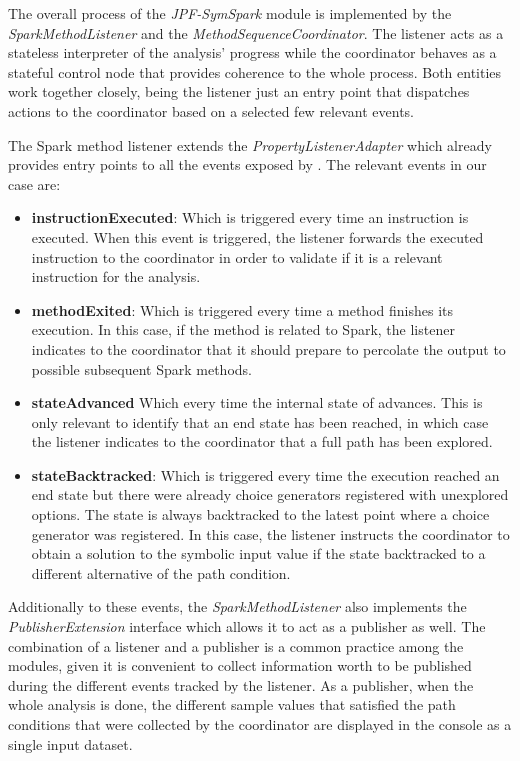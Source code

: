 
The overall process of the \textit{JPF-SymSpark} module is implemented by the \textit{SparkMethodListener} and the \textit{MethodSequenceCoordinator}. The listener acts as a stateless interpreter of the analysis' progress while the coordinator behaves as a stateful control node that provides coherence to the whole process. Both entities work together closely, being the listener just an entry point that dispatches actions to the coordinator based on a selected few relevant events.


The Spark method listener extends the \textit{PropertyListenerAdapter} which already provides entry points to all the events exposed by \jpf. The relevant events in our case are:

\begin{itemize}
	\item \textbf{instructionExecuted}: Which is triggered every time an instruction is executed. When this event is triggered, the listener forwards the executed instruction to the coordinator in order to validate if it is a relevant instruction for the analysis.
	\item \textbf{methodExited}: Which is triggered every time a method finishes its execution. In this case, if the method is related to Spark, the listener indicates to the coordinator that it should prepare to percolate the output to possible subsequent Spark methods.
	\item \textbf{stateAdvanced} Which every time the internal state of \jpf advances. This is only relevant to identify that an end state has been reached, in which case the listener indicates to the coordinator that a full path has been explored.
	\item \textbf{stateBacktracked}: Which is triggered every time the execution reached an end state but there were already choice generators registered with unexplored options. The state is always backtracked to the latest point where a choice generator was registered. In this case, the listener instructs the coordinator to obtain a solution to the symbolic input value if the state backtracked to a different alternative of the path condition.
\end{itemize}

Additionally to these events, the \textit{SparkMethodListener} also implements the \textit{PublisherExtension} interface which allows it to act as a publisher as well. The combination of a listener and a publisher is a common practice among the \jpf modules, given it is convenient to collect information worth to be published during the different events tracked by the listener. As a publisher, when the whole analysis is done, the different sample values that satisfied the path conditions that were collected by the coordinator are displayed in the console as a single input dataset.

